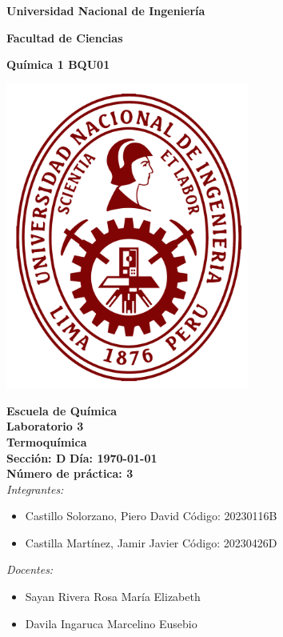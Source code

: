 \documentclass[main.tex]{subfiles}
\begin{document}
\onecolumn

\begin{center}
\textbf{\fontsize{16}{\baselineskip}\selectfont Universidad Nacional de Ingeniería}

\bigskip

\textbf{\fontsize{16}{\baselineskip}\selectfont Facultad de Ciencias}

\bigskip

\textbf{\fontsize{18}{\baselineskip}\selectfont Química 1 BQU01}

\bigskip

\includegraphics[width=8cm]{uni-logo.png}

\textbf{\fontsize{16}{\baselineskip}\selectfont Escuela de Química}
\bigskip \\
\textbf{\fontsize{20}{\baselineskip}\selectfont Laboratorio 3}
\bigskip \\
\textbf{\fontsize{19}{\baselineskip}\selectfont Termoquímica}
\bigskip \\
\textbf{\fontsize{18}{\baselineskip}\selectfont Sección: D}
\quad \quad
\textbf{\fontsize{18}{\baselineskip}\selectfont Día: \today}
\bigskip \\
\textbf{\fontsize{16}{\baselineskip}\selectfont Número de práctica: 3}
\bigskip \\

\textit{\fontsize{16}{\baselineskip}\selectfont Integrantes:}

\begin{itemize}
    \item \fontsize{16}{\baselineskip}\selectfont Castillo Solorzano, Piero David   \quad Código: 20230116B
    \item \fontsize{16}{\baselineskip}\selectfont Castilla Martínez, Jamir Javier   \quad Código: 20230426D
\end{itemize}

\textit{\fontsize{16}{\baselineskip}\selectfont Docentes:}

\begin{itemize}
    \item \fontsize{16}{\baselineskip}\selectfont Sayan Rivera Rosa María Elizabeth
    \item \fontsize{16}{\baselineskip}\selectfont Davila Ingaruca Marcelino Eusebio
\end{itemize}

\bigskip
\end{center}

\clearpage
\end{document}

